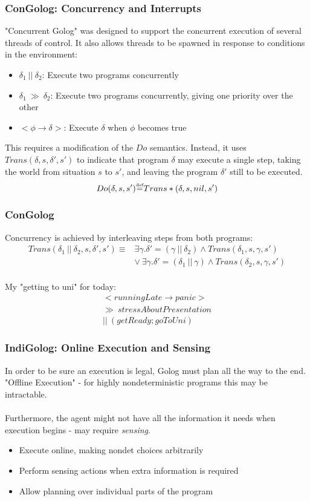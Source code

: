 \documentclass{beamer}
\newcommand{\isdef}{\hbox{$\stackrel{\mbox{\tiny def}}{=}$}}
\begin{document}
\begin{frame}
\frametitle{ConGolog: Concurrency and Interrupts}
"Concurrent Golog" was designed to support the concurrent execution of
several threads of control.  It also allows threads to be spawned in
response to conditions in the environment:
\begin{itemize}
  \pause
  \item $\delta_1\ ||\ \delta_2$: Execute two programs concurrently
  \pause
  \item $\delta_1\ \gg\ \delta_2$: Execute two programs concurrently, giving one priority over the other
  \pause
  \item $<\phi \rightarrow \delta>$: Execute $\delta$ when $\phi$ becomes true
\end{itemize}
\pause
This requires a modification of the $Do$ semantics.  Instead, it uses
$Trans(\delta,s,\delta',s')$ to indicate that program $\delta$ may execute
a single step, taking the world from situation $s$ to $s'$, and leaving the
program $\delta'$ still to be executed.\\
\[
Do(\delta,s,s') \isdef Trans*(\delta,s,nil,s')
\]
\end{frame}

\begin{frame}
\frametitle{ConGolog}
Concurrency is achieved by interleaving steps from both programs:
\[
\begin{array}{cc}
Trans(\delta_1\ ||\ \delta_2,s,\delta',s') \equiv & \exists \gamma . \delta'=(\gamma\ ||\ \delta_2)\wedge Trans(\delta_1,s,\gamma,s')\\
& \vee\ \exists \gamma . \delta'=(\delta_1\ ||\ \gamma)\wedge Trans(\delta_2,s,\gamma,s')
\end{array}\]
\pause
\ \\
My "getting to uni" for today:
\[
\begin{array}{c}
<runningLate\rightarrow panic>\\
\gg\ stressAboutPresentation\\
||\ (getReady;goToUni)
\end{array}\]

\end{frame}

\begin{frame}
\frametitle{IndiGolog: Online Execution and Sensing}
In order to be sure an execution is legal, Golog must plan all the way
to the end.  "Offline Execution" - for highly nondeterministic programs
this may be intractable.\\
\ \\
Furthermore, the agent might not have all the information it needs when
execution begins - may require \emph{sensing}.

\begin{itemize}
  \pause
  \item Execute online, making nondet choices arbitrarily
  \pause
  \item Perform sensing actions when extra information is required
  \pause
  \item Allow planning over individual parts of the program
\end{itemize}
\end{frame}
\end{document}
